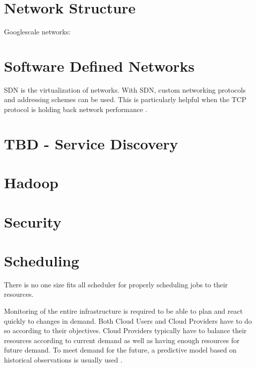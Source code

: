 \documentclass[fullapage,12pt]{article}
\begin{document}



\section{Network Structure}

Googlescale networks: \cite{singh2015jupiter} %

\section{Software Defined Networks}

SDN is the virtualization of networks. With SDN, custom networking protocols and addressing schemes can be used. This is particularly helpful when the TCP protocol is holding back network performance \cite{Jennings2015}.

\section{TBD - Service Discovery}

\section{Hadoop}

\section{Security}

\section{Scheduling}

There is no one size fits all scheduler for properly scheduling jobs to their resources.

Monitoring of the entire infrastructure is required to be able to plan and react quickly to changes in demand. Both Cloud Users and Cloud Providers have to do so according to their objectives.
Cloud Providers typically have to balance their resources according to current demand as well as having enough resources for future demand. To meet demand for the future, a predictive model based on historical observations is usually used \cite{Jennings2015}.
\end{document}
